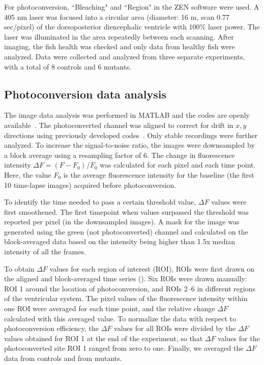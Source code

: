 \documentclass{WileyMSP-template}
\begin{document}
For photoconversion, ``Bleaching" and ``Region" in the ZEN software
were used. A 405 nm laser was focused into a circular area (diameter: 16 \textmu m, scan 0.77 \textmu sec/pixel)
of the dorsoposterior diencephalic ventricle with 100\% laser power.
The laser was illuminated in the area repeatedly between each scanning.
After imaging, the fish health was checked and only data from healthy fish were analyzed.
Data were collected and analyzed from three separate experiments,
with a total of 8 controls and 6 mutants.

\subsection{Photoconversion data analysis}
The image data analysis was performed in MATLAB and the codes are
openly available~\cite{Herlyng2025Zenodo}.  The
photoconverted channel was aligned to correct for drift in $x,y$
directions using previously developed
codes~\cite{Reiten2017Motile-Cilia-MediatedComputations,
  Ringers2023NovelEpithelia}.  Only stable recordings were further
analyzed.  To increase the signal-to-noise ratio, the images were
downsampled by a block average using a resampling factor of 6. 
The change in fluorescence intensity
$\Delta F = (F-F_0)/F_0$ was
calculated for each pixel and each time point.  Here, the
value $F_0$ is the average fluorescence intensity for the baseline
(the first 10 time-lapse images) acquired before photoconversion.

To identify the time needed to pass a certain threshold value,
$\Delta F$ values were first smoothened.
The first timepoint when values surpassed the threshold was reported
per pixel (in the downsampled images).
A mask for the image was generated using the green (not photoconverted)
channel and calculated on the block-averaged data based on the intensity
being higher than 1.5x median intensity of all the frames.

To obtain $\Delta F$ values for each region of interest (ROI), ROIs were
first drawn on the aligned and block-averaged time series ().
Six ROIs were drawn manually: ROI 1 around the location of photoconversion,
and ROIs 2--6 in different regions of the ventricular system.
The pixel values of the fluorescence intensity within one ROI were
averaged for each time point, and the relative change $\Delta F$ calculated with this averaged value.
To normalize the data with respect to photoconversion efficiency, the
$\Delta F$ values for all ROIs were divided by the $\Delta F$ values
obtained for ROI 1 at the end of the experiment,
so that $\Delta F$ values for the photoconverted site ROI 1 ranged from
zero to one. Finally, we averaged the $\Delta F$ data from controls and from mutants.
\end{document}
